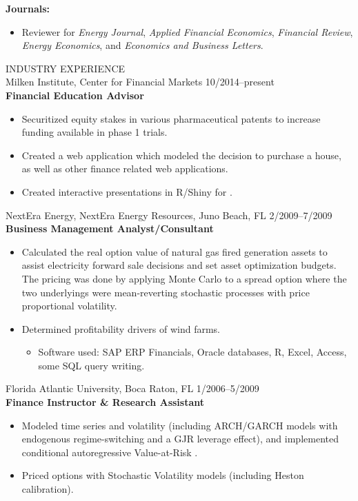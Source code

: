 \documentclass[9pt]{article}
\begin{document}
{\bf Journals:}
\begin{itemize}[noitemsep, nolistsep]
\item Reviewer for {\it Energy Journal}, {\it Applied Financial Economics}, {\it Financial Review}, {\it Energy Economics}, and {\it Economics and Business Letters}.
\end{itemize}
\vspace{10pt}
INDUSTRY EXPERIENCE \\
Milken Institute, Center for Financial Markets \hfill \hfill 10/2014--present\\
{\bf Financial Education Advisor} \\
\begin{itemize}[noitemsep, nolistsep]
  \item Securitized equity stakes in various pharmaceutical patents to increase funding available in phase 1 trials.
  \item Created a web application which modeled the decision to purchase a house, as well as other finance related web applications. 
  \item Created interactive presentations in R/Shiny for {\color{Blue}{5MinuteFinance.org}}.
\end{itemize}
\vspace{5pt}
NextEra Energy, NextEra Energy Resources, Juno Beach, FL \hfill  \hfill 2/2009--7/2009\\
{\bf Business Management Analyst/Consultant}
\begin{itemize}[noitemsep, nolistsep]
\item Calculated the real option value of natural gas fired generation assets to assist electricity forward sale decisions and set asset optimization budgets.  The pricing was done by applying Monte Carlo to a spread option where the two underlyings were mean-reverting stochastic processes with price proportional volatility.
\item Determined profitability drivers of wind farms.
\begin{itemize}[noitemsep, nolistsep]
\item Software used: SAP ERP Financials, Oracle databases, R, Excel, Access, some SQL query writing.
\end{itemize}
\end{itemize}
\vspace{5pt}
Florida Atlantic University, Boca Raton, FL \hfill  \hfill 1/2006--5/2009\\
{\bf Finance Instructor \& Research Assistant}
\begin{itemize}[noitemsep, nolistsep]
\item Modeled time series and volatility (including ARCH/GARCH models with endogenous regime-switching and a GJR leverage effect), and implemented conditional autoregressive Value-at-Risk .
\item Priced options with Stochastic Volatility models (including Heston calibration).
\end{itemize}
\end{document}
